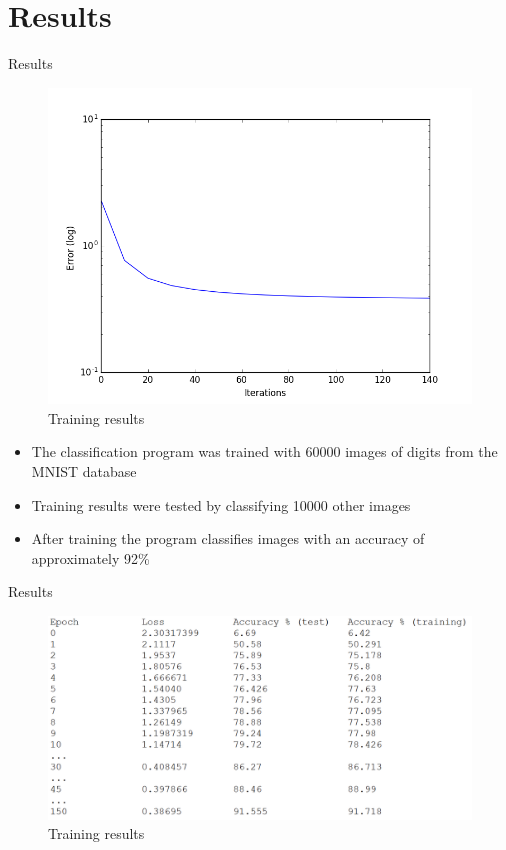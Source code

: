 \documentclass[12pt]{beamer}
\begin{document}
\section{Results}
\begin{frame}{Results}
\begin{figure}
\centering
\includegraphics[width = 0.4\linewidth]{images/figure_1.png}
\caption{Training results}
\label{fig:principle}
\end{figure}
\begin{itemize}
\item The classification program was trained with 60000 images of digits from the MNIST database
\item Training results were tested by classifying 10000 other images
\item After training the program classifies images with an accuracy of approximately 92\%
\end{itemize}
\end{frame}
\begin{frame}{Results}
\begin{figure}
\centering
\includegraphics[width = 1\linewidth]{images/results.png}
\caption{Training results}
\label{fig:principle}
\end{figure}
\end{frame}
\end{document}
